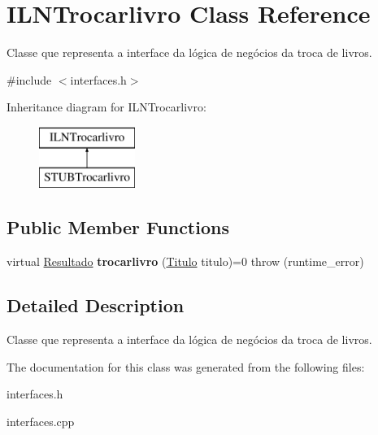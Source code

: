 \hypertarget{classILNTrocarlivro}{}\section{I\+L\+N\+Trocarlivro Class Reference}
\label{classILNTrocarlivro}


Classe que representa a interface da lógica de negócios da troca de livros.  




{\ttfamily \#include $<$interfaces.\+h$>$}

Inheritance diagram for I\+L\+N\+Trocarlivro\+:\begin{figure}[H]
\begin{center}
\leavevmode
\includegraphics[height=2.000000cm]{classILNTrocarlivro}
\end{center}
\end{figure}
\subsection*{Public Member Functions}
\begin{DoxyCompactItemize}
\item 
\mbox{\label{classILNTrocarlivro_ab6e99e11b1eee5edc46594c047445442}} 
virtual \hyperlink{classResultado}{Resultado} {\bfseries trocarlivro} (\hyperlink{classTitulo}{Titulo} titulo)=0  throw (runtime\+\_\+error)
\end{DoxyCompactItemize}


\subsection{Detailed Description}
Classe que representa a interface da lógica de negócios da troca de livros. 

The documentation for this class was generated from the following files\+:\begin{DoxyCompactItemize}
\item 
interfaces.\+h\item 
interfaces.\+cpp\end{DoxyCompactItemize}
